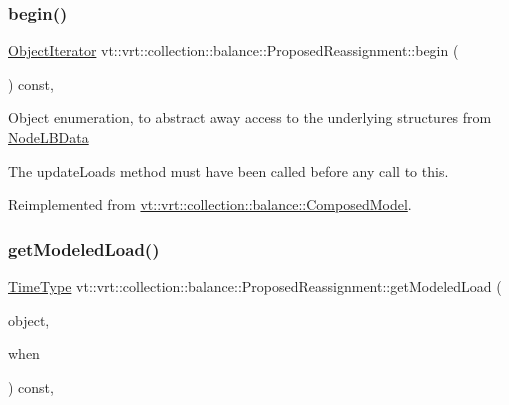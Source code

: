 \subsubsection{\texorpdfstring{begin()}{begin()}}
{\footnotesize\ttfamily \hyperlink{structvt_1_1vrt_1_1collection_1_1balance_1_1_object_iterator}{Object\+Iterator} vt\+::vrt\+::collection\+::balance\+::\+Proposed\+Reassignment\+::begin (\begin{DoxyParamCaption}{ }\end{DoxyParamCaption}) const\hspace{0.3cm}{\ttfamily [override]}, {\ttfamily [virtual]}}

Object enumeration, to abstract away access to the underlying structures from \hyperlink{structvt_1_1vrt_1_1collection_1_1balance_1_1_node_l_b_data}{Node\+L\+B\+Data}

The {\ttfamily update\+Loads} method must have been called before any call to this. 

Reimplemented from \hyperlink{classvt_1_1vrt_1_1collection_1_1balance_1_1_composed_model_a7d32b6f8a0ca5970674238325df11783}{vt\+::vrt\+::collection\+::balance\+::\+Composed\+Model}.

\mbox{\label{structvt_1_1vrt_1_1collection_1_1balance_1_1_proposed_reassignment_aca9fab69b816133d56dfa88418e0e54f}} 
\subsubsection{\texorpdfstring{get\+Modeled\+Load()}{getModeledLoad()}}
{\footnotesize\ttfamily \hyperlink{namespacevt_a876a9d0cd5a952859c72de8a46881442}{Time\+Type} vt\+::vrt\+::collection\+::balance\+::\+Proposed\+Reassignment\+::get\+Modeled\+Load (\begin{DoxyParamCaption}\item[{\hyperlink{namespacevt_1_1vrt_1_1collection_1_1balance_a9f5b53fafb270212279a4757d2c4cd28}{Element\+I\+D\+Struct}}]{object,  }\item[{\hyperlink{structvt_1_1vrt_1_1collection_1_1balance_1_1_phase_offset}{Phase\+Offset}}]{when }\end{DoxyParamCaption}) const\hspace{0.3cm}{\ttfamily [override]}, {\ttfamily [virtual]}}



